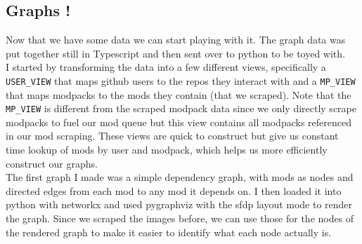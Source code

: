 \documentclass[a4paper,12pt, twocolumn]{article}
\begin{document}
\subsection{Graphs !}

Now that we have some data we can start playing with it. The graph data was put together still in Typescript and then sent over to python to be toyed with.\\

I started by transforming the data into a few different views, specifically a \verb|USER_VIEW| that maps github users to the repos they interact with and a \verb|MP_VIEW| that maps modpacks to the mods they contain (that we scraped). Note that the \verb|MP_VIEW| is different from the scraped modpack data since we only directly scrape modpacks to fuel our mod queue but this view contains all modpacks referenced in our mod scraping. These views are quick to construct but give us constant time lookup of mods by user and modpack, which helps us more efficiently construct our graphs.\\

The first graph I made was a simple dependency graph, with mods as nodes and directed edges from each mod to any mod it depends on. I then loaded it into python with networkx and used pygraphviz with the sfdp layout mode to render the graph. Since we scraped the images before, we can use those for the nodes of the rendered graph to make it easier to identify what each node actually is.\\
\end{document}
